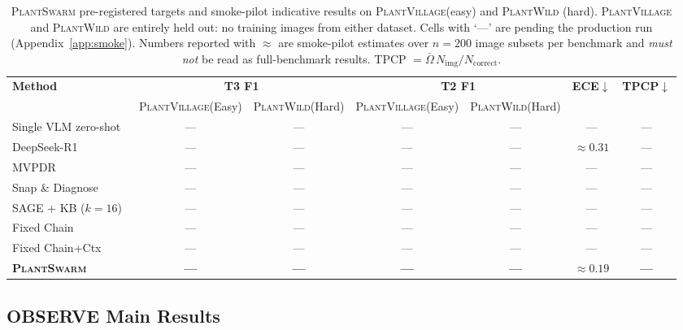 \documentclass[11pt,twocolumn]{article}
\newcommand{\plantswarm}{\textsc{PlantSwarm}\xspace}
\newcommand{\pv}{\textsc{PlantVillage}\xspace}
\newcommand{\pw}{\textsc{PlantWild}\xspace}
\begin{document}
\begin{table}[t]\centering\scriptsize
\setlength{\tabcolsep}{2pt}
\begin{tabular}{lcccccc}
\toprule
\multirow{2}{*}{\textbf{Method}} &
\multicolumn{2}{c}{\textbf{T3 F1}} &
\multicolumn{2}{c}{\textbf{T2 F1}} &
\multirow{2}{*}{\textbf{ECE$\downarrow$}} &
\multirow{2}{*}{\textbf{TPCP$\downarrow$}} \\
\cmidrule(lr){2-3}\cmidrule(lr){4-5}
& \pv (Easy) & \pw (Hard)
& \pv (Easy) & \pw (Hard) & & \\
\midrule
Single VLM zero-shot      & --- & --- & --- & --- & --- & --- \\
DeepSeek-R1~\citep{guo2025deepseek}
                          & --- & --- & --- & --- & ${\approx}0.31$ & --- \\
MVPDR~\citep{tqwei2024mvpdr}
                          & --- & --- & --- & --- & --- & --- \\
Snap \& Diagnose~\citep{tqwei2024snapdiagnose}
                          & --- & --- & --- & --- & --- & --- \\
SAGE + KB ($k{=}16$)~\citep{sage2025}
                          & --- & --- & --- & --- & --- & --- \\
Fixed Chain     & --- & --- & --- & --- & --- & --- \\
Fixed Chain+Ctx& --- & --- & --- & --- & --- & --- \\
\textbf{\plantswarm} & \textbf{---} & \textbf{---}
                          & \textbf{---} & \textbf{---}
                          & ${\approx}\mathbf{0.19}$ & \textbf{---} \\
\bottomrule
\end{tabular}
\caption{\plantswarm pre-registered targets and
  smoke-pilot indicative results on \pv (easy) and \pw
  (hard). \pv and \pw are entirely held out: no training
  images from either dataset. Cells with `---' are
  pending the production run (Appendix~\ref{app:smoke}).
  Numbers reported with $\approx$ are smoke-pilot
  estimates over $n{=}200$ image subsets per benchmark
  and \emph{must not} be read as full-benchmark results.
  TPCP $= \bar\Omega\,N_\text{img}/N_\text{correct}$.}
\label{tab:plantswarm-main}
\end{table}

\subsection{OBSERVE Main Results}
\end{document}
